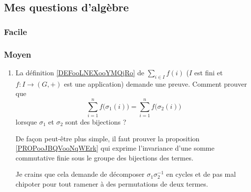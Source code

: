 \subsection{Mes questions d'algèbre}

\subsubsection{Facile}

\subsubsection{Moyen}

\begin{enumerate}
    \item La définition \ref{DEFooLNEXooYMQjRo} de \( \sum_{i\in I}f(i)\)  (\( I\) est fini et \( f\colon I\to (G,+)\) est une application) demande une preuve. Comment prouver que
    \begin{equation}
        \sum_{i=1}^nf\big( \sigma_1(i) \big)=\sum_{i=1}^nf\big( \sigma_2(i) \big)
    \end{equation}
    lorsque \( \sigma_1\) et \( \sigma_2\) sont des bijections ? 

    De façon peut-être plus simple, il faut prouver la proposition \ref{PROPooJBQVooNqWErk} qui exprime l'invariance d'une somme commutative finie sous le groupe des bijections des termes.

    Je crains que cela demande de décomposer \( \sigma_1\sigma_2^{-1}\) en cycles et de pas mal chipoter pour tout ramener à des permutations de deux termes.
\end{enumerate}

